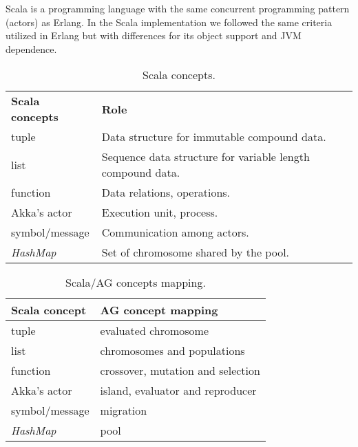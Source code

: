 
Scala is a programming language with the same concurrent programming pattern (actors) as Erlang. In the Scala implementation we followed the same criteria utilized in Erlang but with differences for its object support and JVM dependence.

\begin{table*}
  \centering
   \caption{Scala concepts.}\label{sclConstructions}
\begin{tabular}{|>{\centering}p{3.4cm}|p{7cm}|}
  \hline
  \textbf{Scala concepts} & \textbf{Role} \tabularnewline
  tuple & Data structure for immutable compound data. \tabularnewline
    \hline
 list & Sequence data structure for variable length compound data.
 \tabularnewline
    \hline
 function & Data relations, operations. \tabularnewline
     \hline
    Akka's actor & Execution unit, process. \tabularnewline
     \hline
  symbol/message & Communication among actors. \tabularnewline
     \hline
  {\em HashMap} & Set of chromosome shared by the pool. \tabularnewline
     \hline
\end{tabular}

\end{table*}

\begin{table*}
  \centering
  \caption{Scala/AG concepts mapping.}\label{sclAGRelation}
\begin{tabular}{|>{\centering}p{3cm}|p{6cm}|}
  \hline
  \textbf{Scala concept} & \textbf{AG concept mapping} \tabularnewline
  \hline
   tuple & evaluated chromosome \tabularnewline
    \hline
 list & chromosomes and populations \tabularnewline
    \hline
 function & crossover, mutation and selection \tabularnewline
    \hline
  Akka's actor & island, evaluator and reproducer \tabularnewline
     \hline
  symbol/message & migration \tabularnewline
     \hline
  {\em HashMap} & pool \tabularnewline
     \hline
\end{tabular}

\end{table*}






